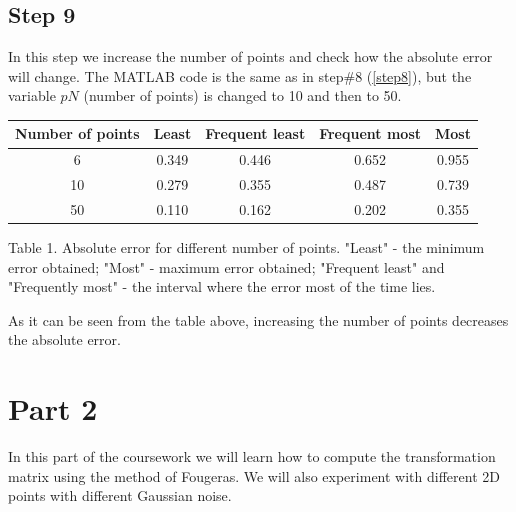 \documentclass[a4paper, 10pt]{article}
\begin{document}
\subsection{Step 9}\label{step9}
In this step we increase the number of points and check how the absolute error will change. The MATLAB code is the same as in step\#8 (\ref{step8}), but the variable $pN$ (number of points) is changed to 10 and then to 50.
\begin{center}
	\begin{tabular}{c|c|c|c|c}
	Number of points&Least&Frequent least&Frequent most&Most\\
	\hline
	6 & 0.349 & 0.446 & 0.652 & 0.955\\
	10 & 0.279 & 0.355 & 0.487 & 0.739\\
	50 & 0.110 & 0.162 & 0.202 & 0.355
	\end{tabular}\par
	\bigskip
	Table 1. Absolute error for different number of points. "Least" - the minimum error obtained; "Most" - maximum error obtained; "Frequent least" and "Frequently most" - the interval where the error most of the time lies.
\end{center}
As it can be seen from the table above, increasing the number of points decreases the absolute error.
\section{Part 2}
In this part of the coursework we will learn how to compute the transformation matrix using the method of Fougeras. We will also experiment with different 2D points with different Gaussian noise.
\end{document}
